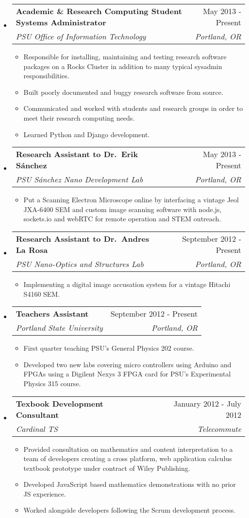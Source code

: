 \documentclass[letterpaper,11pt]{article}
\makeatletter
\newcommand{\resitem}[1]{\item #1 \vspace{-2pt}}
\newcommand{\ressubheading}[4]{
\begin{tabular*}{7.0in}{l@{\extracolsep{\fill}}r}
		\textbf{#1} & #2 \\
		\textit{#3} & \textit{#4} \\
\end{tabular*}\vspace{-6pt}}
\makeatother
\begin{document}
\begin{itemize}

\item
\ressubheading
{Academic \& Research Computing Student Systems Administrator}
{May 2013 - Present}
{PSU Office of Information Technology}
{Portland, OR}
\begin{itemize}
    \resitem{Responsible for installing, maintaining and testing research software packages on a Rocks Cluster in addition to many typical sysadmin responsibilities.}
    \resitem{Built poorly documented and buggy research software from source.}
    \resitem{Communicated and worked with students and research groups in order to meet their research computing needs.}
    \resitem{Learned Python and Django development.}
\end{itemize}

\item
\ressubheading
{Research Assistant to Dr.\ Erik S\'anchez}
{May 2013 - Present}
{PSU S\'anchez Nano Development Lab}
{Portland, OR}

		\begin{itemize}
			\resitem{Put a Scanning Electron Microscope online by interfacing a vintage Jeol JXA-6400 SEM and custom image scanning software with node.js, sockets.io and webRTC for remote operation and STEM outreach.}
		\end{itemize}

	
\item
\ressubheading
{Research Assistant to Dr.\ Andres La Rosa}
{September 2012 - Present}
{PSU Nano-Optics and Structures Lab}
{Portland, OR}
		\begin{itemize}
			\resitem{Implementing a digital image accusation system for a vintage Hitachi S4160 SEM.}
		\end{itemize}


	\item
		\ressubheading
        {Teachers Assistant}
        {September 2012 - Present}
        {Portland State University}
        {Portland, OR}
		\begin{itemize}
			\resitem{First quarter teaching PSU's General Physics 202 course.}
			\resitem{Developed two new labs covering micro controllers using Arduino and FPGAs using a Digilent Nexys 3 FPGA card for PSU's Experimental Physics 315 course.}
		\end{itemize}

	\item
		\ressubheading{Texbook Development Consultant}{January 2012 - July 2012}{Cardinal TS}{Telecommute}
		\begin{itemize}
			\resitem{Provided consultation on mathematics and content interpretation to a team of developers creating a cross platform, web application calculus textbook prototype under contract of Wiley Publishing.}
			\resitem{Developed JavaScript based mathematics demonstrations with no prior JS experience.}
            \resitem{Worked alongside developers following the Scrum development process.}
		\end{itemize}


\end{itemize}
\end{document}

